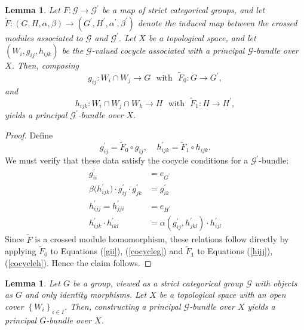 \documentclass{article}
\theoremstyle{plain}
\newtheorem{lem}[thm]{Lemma}
\theoremstyle{definition}
\begin{document}
\begin{lem}\label{priGtoG'}
Let $F:\mathcal{G} \longrightarrow \mathcal{G}^\prime$ be a map of strict categorical groups, and let $\widetilde{F}:(G,H,\alpha,\beta) \longrightarrow (G^\prime,H^\prime,\alpha^\prime,\beta^\prime)$ denote the induced map between the crossed modules associated to $\mathcal{G}$ and $\mathcal{G}^\prime$. Let $X$ be a topological space, and let $(W_i,g_{ij},h_{ijk})$ be the $\mathcal{G}$-valued cocycle associated with a principal $\mathcal{G}$-bundle over $X$. Then, composing $$g_{ij}:W_i \cap W_j \longrightarrow G ~~~ \text{with} ~~~ \widetilde{F}_0:G \longrightarrow G^\prime,$$ and $$h_{ijk}:W_i \cap W_j \cap W_k \longrightarrow H ~~~ \text{with} ~~~ \widetilde{F}_1:H \longrightarrow H^\prime,$$ yields a principal $\mathcal{G}^\prime$-bundle over $X$.
\end{lem}
\begin{proof}
Define $$g^\prime_{ij} = \widetilde{F}_0 \circ g_{ij}, ~~~~~ h^\prime_{ijk} = \widetilde{F}_1 \circ h_{ijk}.$$
We must verify that these data satisfy the cocycle conditions for a $\mathcal{G}^\prime$-bundle:
\begin{align*}
g^\prime_{ii} & = e_{G^\prime} \\
\beta\bigl(h^\prime_{ijk}\bigr) \cdot g^\prime_{ij} \cdot g^\prime_{jk} & = g^\prime_{ik} \\
h^\prime_{ijj} = h^\prime_{jji} & = e_{H^\prime} \\
h^\prime_{ijk} \cdot h^\prime_{ikl} & = \alpha(g^\prime_{ij},h^\prime_{jkl}) \cdot h^\prime_{ijl}
\end{align*}
Since $\widetilde{F}$ is a crossed module homomorphism, these relations follow directly by applying $\widetilde{F}_0$ to Equations (\ref{gii}), (\ref{cocycleg}) and $\widetilde{F}_1$ to Equations (\ref{hijj}), (\ref{cocycleh}). Hence the claim follows.
\end{proof}
\begin{lem}\label{primathGtoG}
Let $G$ be a group, viewed as a strict categorical group $\mathcal{G}$ with objects as $G$ and only identity morphisms. Let $X$ be a topological space with an open cover $\left\{W_i\right\}_{i \in I}$. Then, constructing a principal $\mathcal{G}$-bundle over $X$ yields a principal $G$-bundle over $X$.
\end{lem}
\end{document}
